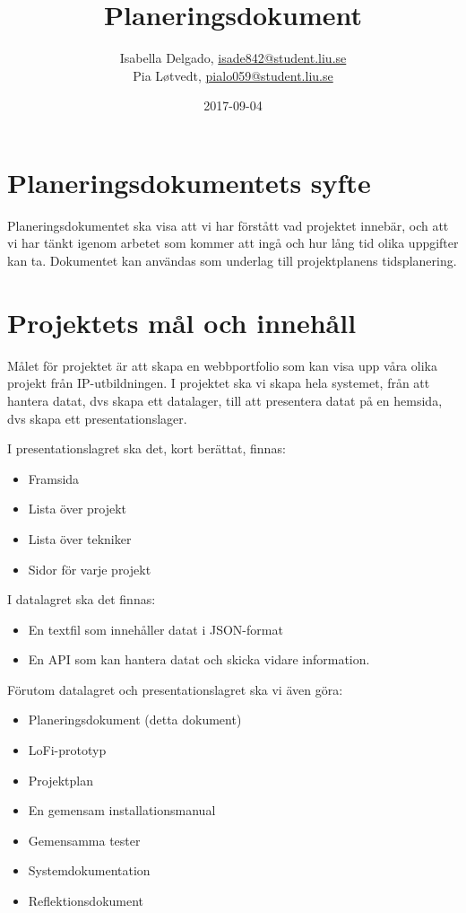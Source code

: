 \documentclass{TDP003mall}
\author{Isabella Delgado, \url{isade842@student.liu.se}\\
  Pia Løtvedt, \url{pialo059@student.liu.se}}
\title{Planeringsdokument}
\date{2017-09-04}
\begin{document}
\projectpage

\section{Planeringsdokumentets syfte}
Planeringsdokumentet ska visa att vi har förstått vad projektet innebär, och att vi har tänkt igenom arbetet som kommer att ingå och hur lång tid olika uppgifter kan ta. Dokumentet kan användas som underlag till projektplanens tidsplanering.

\section{Projektets mål och innehåll}
Målet för projektet är att skapa en webbportfolio som kan visa upp våra olika projekt från IP-utbildningen. I projektet ska vi skapa hela systemet, från att hantera datat, dvs skapa ett datalager, till att presentera datat på en hemsida, dvs skapa ett presentationslager.

I presentationslagret ska det, kort berättat, finnas:

\begin{itemize}
\item Framsida
\item Lista över projekt
\item Lista över tekniker
\item Sidor för varje projekt
\end{itemize}


\medskip
I datalagret ska det finnas:
\begin{itemize}
\item En textfil som innehåller datat i JSON-format
\item En API som kan hantera datat och skicka vidare information.
\end{itemize}

\medskip

Förutom datalagret och presentationslagret ska vi även göra:

\begin{itemize}
\item Planeringsdokument (detta dokument)
\item LoFi-prototyp
\item Projektplan
\item En gemensam installationsmanual
\item Gemensamma tester
\item Systemdokumentation
\item Reflektionsdokument
\end{itemize}
\end{document}

